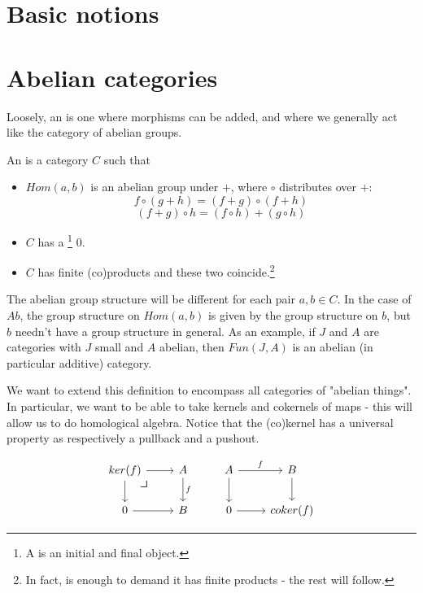 \section{Basic notions}


\section{Abelian categories}
Loosely, an  is one where morphisms can be added, and where we generally act like the category of abelian groups. 
\begin{definition}
An  is a category $C$ such that 
\begin{itemize}
    \item $Hom(a,b)$ is an abelian group under $+$, where $\circ$ distributes over $+$:
    $$f\circ (g+h)=(f+g)\circ (f+h)$$
    $$(f+g)\circ h=(f\circ h)+(g\circ h)$$
    \item $C$ has a \footnote{A  is an initial and final object.} $0$.
    \item $C$ has finite (co)products and these two coincide.\footnote{In fact, is enough to demand it has finite products - the rest will follow.}
\end{itemize}
\end{definition}
The abelian group structure will be different for each pair $a,b\in C$. In the case of $Ab$, the group structure on $Hom(a,b)$ is given by the group structure on $b$, but $b$ needn't have a group structure in general. As an example, if $J$ and $A$ are categories with $J$ small and $A$ abelian, then $Fun(J,A)$ is an abelian (in particular additive) category.

We want to extend this definition to encompass all categories of "abelian things". In particular, we want to be able to take kernels and cokernels of maps - this will allow us to do homological algebra. Notice that the (co)kernel has a universal property as respectively a pullback and a pushout.

\[\begin{tikzcd}
ker(f) \pullback
\arrow[r] \arrow[d] & A \arrow[d, "f"] & A \arrow[r, "f"] \arrow[d] & B \arrow[d] \\
0 \arrow[r]                & B                & 0 \arrow[r]                & coker(f)   
\end{tikzcd}\]

